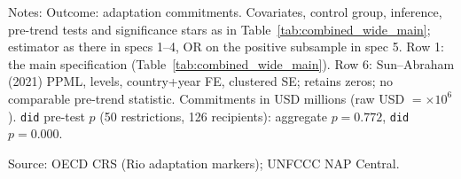 \begin{table}[H]
\centering
\caption{Sensitivity of the main-specification ATT to outcome units and the treatment of zeros}
\label{tab:units_zeros}
\begingroup\small
{}
\endgroup
\par\vspace{4pt}
\begin{minipage}{\linewidth}\footnotesize
Notes: Outcome: adaptation commitments. Covariates, control group, inference, pre-trend tests and significance stars as in Table~\ref{tab:combined_wide_main}; estimator as there in specs 1--4, OR on the positive subsample in spec 5. Row 1: the main specification (Table~\ref{tab:combined_wide_main}). Row 6: Sun--Abraham (2021) PPML, levels, country+year FE, clustered SE; retains zeros; no comparable pre-trend statistic. Commitments in USD millions (raw USD $= \times 10^6$). \texttt{did} pre-test $p$ (50 restrictions, 126 recipients): aggregate $p = 0.772$, \texttt{did} $p = 0.000$.\par
Source: OECD CRS (Rio adaptation markers); UNFCCC NAP Central.
\end{minipage}
\end{table}
